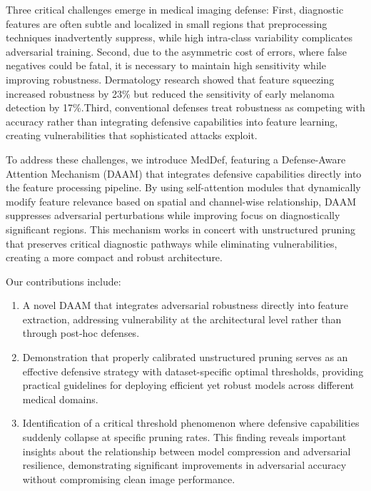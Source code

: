 \documentclass[preprint,12pt]{elsarticle}
\begin{document}
Three critical challenges emerge in medical imaging defense: First, diagnostic features are often subtle and localized in small regions that preprocessing techniques inadvertently suppress\cite{Chiang20}, while high intra-class variability complicates adversarial training. Second, due to the asymmetric cost of errors, where false negatives could be fatal, it is necessary to maintain high sensitivity while improving robustness. Dermatology research showed that feature squeezing increased robustness by 23\% but reduced the sensitivity of early melanoma detection by 17\%\cite{Sahu24}.Third, conventional defenses treat robustness as competing with accuracy rather than integrating defensive capabilities into feature learning, creating vulnerabilities that sophisticated attacks exploit\cite{Sriramanan21}.

To address these challenges, we introduce MedDef, featuring a Defense-Aware Attention Mechanism (DAAM) that integrates defensive capabilities directly into the feature processing pipeline. By using self-attention modules that dynamically modify feature relevance based on spatial and channel-wise relationship, DAAM suppresses adversarial perturbations while improving focus on diagnostically significant regions. This mechanism works in concert with unstructured pruning that preserves critical diagnostic pathways while eliminating vulnerabilities, creating a more compact and robust architecture\cite{Liebenwein21}.

Our contributions include:
\begin{enumerate}
    \item A novel DAAM that integrates adversarial robustness directly into feature extraction, addressing vulnerability at the architectural level rather than through post-hoc defenses.
    
    \item Demonstration that properly calibrated unstructured pruning serves as an effective defensive strategy with dataset-specific optimal thresholds, providing practical guidelines for deploying efficient yet robust models across different medical domains.
    
    \item Identification of a critical threshold phenomenon where defensive capabilities suddenly collapse at specific pruning rates. This finding reveals important insights about the relationship between model compression and adversarial resilience, demonstrating significant improvements in adversarial accuracy without compromising clean image performance.
\end{enumerate}
\end{document}
